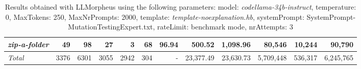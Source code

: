 \begin{table*}
{\begin{tabular}{l||r|r|r|r|r|r||r|r||r|r|r}
   \hline
   \textit{zip-a-folder} & 49 & 98 & 27 & 3 & 68 & 96.94 & 500.52 & 1,098.96 & 80,546 & 10,244 & 90,790 \\ 
   \hline
   \textit{Total} & 3376 & 6301 & 3055 & 2942 & 304 & - & 23,377.49  & 23,630.73 & 5,709,448 & 536,317 & 6,245,765 \\ 
 \end{tabular}
 }
 \caption{Results obtained with LLMorpheus using the following parameters: 
   model: \textit{codellama-34b-instruct}, 
   temperature: 0, 
   MaxTokens: 250, 
   MaxNrPrompts: 2000, 
   template: \textit{template-noexplanation.hb}, 
   systemPrompt: SystemPrompt-MutationTestingExpert.txt, 
   rateLimit: benchmark mode, 
   nrAttempts: 3  
 }
\end{table*}


